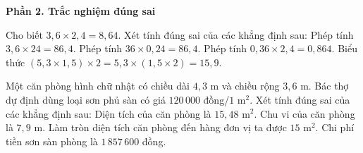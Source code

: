\textbf{Phần 2. Trắc nghiệm đúng sai}

\begin{ex} %
Cho biết $3{,}6 \times 2{,}4 = 8{,}64$. Xét tính đúng sai của các khẳng định sau:
\choiceTF
{\True Phép tính $3{,}6 \times 24 = 86{,}4$.}
{Phép tính $36 \times 0{,}24 = 86{,}4$.}
{\True Phép tính $0{,}36 \times 2{,}4 = 0{,}864$.}
{\True Biểu thức $(5{,}3 \times 1{,}5) \times 2 = 5{,}3 \times (1{,}5 \times 2) = 15{,}9$.}
\end{ex}

\begin{ex} %
Một căn phòng hình chữ nhật có chiều dài $4{,}3\text{ m}$ và chiều rộng $3{,}6\text{ m}$. Bác thợ dự định dùng loại sơn phủ sàn có giá $120\,000$ đồng/$1\text{ m}^2$. Xét tính đúng sai của các khẳng định sau:
\choiceTF
{\True Diện tích của căn phòng là $15{,}48\text{ m}^2$.}
{Chu vi của căn phòng là $7{,}9\text{ m}$.}
{\True Làm tròn diện tích căn phòng đến hàng đơn vị ta được $15\text{ m}^2$.}
{\True Chi phí tiền sơn sàn phòng là $1\,857\,600$ đồng.}
\end{ex}

